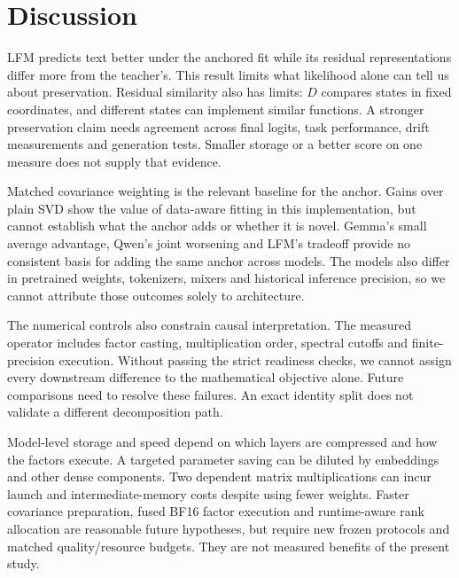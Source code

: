 \documentclass[conference]{IEEEtran}
\begin{document}
\section{Discussion}
LFM predicts text better under the anchored fit while its residual representations differ more from the teacher's. This result limits what likelihood alone can tell us about preservation. Residual similarity also has limits: $D$ compares states in fixed coordinates, and different states can implement similar functions. A stronger preservation claim needs agreement across final logits, task performance, drift measurements and generation tests. Smaller storage or a better score on one measure does not supply that evidence.\par\smallskip
Matched covariance weighting is the relevant baseline for the anchor. Gains over plain SVD show the value of data-aware fitting in this implementation, but cannot establish what the anchor adds or whether it is novel. Gemma's small average advantage, Qwen's joint worsening and LFM's tradeoff provide no consistent basis for adding the same anchor across models. The models also differ in pretrained weights, tokenizers, mixers and historical inference precision, so we cannot attribute those outcomes solely to architecture.\par\smallskip
The numerical controls also constrain causal interpretation. The measured operator includes factor casting, multiplication order, spectral cutoffs and finite-precision execution. Without passing the strict readiness checks, we cannot assign every downstream difference to the mathematical objective alone. Future comparisons need to resolve these failures. An exact identity split does not validate a different decomposition path.\par\smallskip
Model-level storage and speed depend on which layers are compressed and how the factors execute. A targeted parameter saving can be diluted by embeddings and other dense components. Two dependent matrix multiplications can incur launch and intermediate-memory costs despite using fewer weights. Faster covariance preparation, fused BF16 factor execution and runtime-aware rank allocation are reasonable future hypotheses, but require new frozen protocols and matched quality/resource budgets. They are not measured benefits of the present study.\par\smallskip
\end{document}
